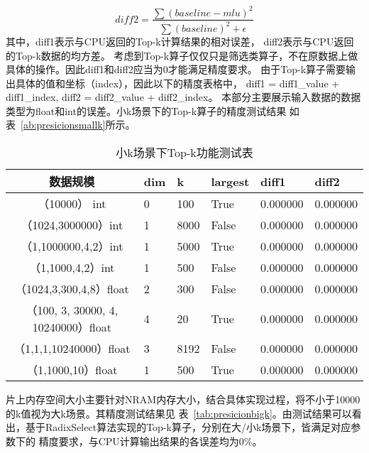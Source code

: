     \begin{equation}
    \label{eq:diff2}
    diff2 = \frac{\sum (baseline - mlu)^2}{\sum (baseline)^2 + \epsilon}
    \end{equation}
其中，diff1表示与CPU返回的Top-k计算结果的相对误差，
diff2表示与CPU返回的Top-k数据的均方差。
考虑到Top-k算子仅仅只是筛选类算子，不在原数据上做具体的操作。因此diff1和diff2应当为0才能满足精度要求。
由于Top-k算子需要输出具体的值和坐标（index），因此以下的精度表格中，
diff1 = diff1\_value + diff1\_index,
diff2 = diff2\_value + diff2\_index。
本部分主要展示输入数据的数据类型为float和int的误差。小k场景下的Top-k算子的精度测试结果
如表~\ref{ab:presicionsmallk}所示。
\begin{table}
\centering
\caption{小k场景下Top-k功能测试表}
\label{tab:presicionsmallk}
\begin{tabular}{clllll}
    \toprule
    数据规模      &dim   & k  & largest & diff1    & diff2 \\
    \midrule
    （10000） int &0  & 100      & True      & 0.000000 & 0.000000 \\
    （1024,3000000）int&1 & 8000 & False      & 0.000000 & 0.000000 \\
    （1,1000000,4,2）int &1  & 5000 & True      & 0.000000 & 0.000000 \\
    （1,1000,4,2）int &1  & 500 & False      & 0.000000 & 0.000000 \\
    
    （1024,3,300,4,8）float&2 & 300 & False      & 0.000000 & 0.000000 \\
    （100, 3, 30000, 4, 10240000）float&4 & 20 & True      & 0.000000 & 0.000000 \\
    （1,1,1,10240000）float & 3 & 8192 & False      & 0.000000 & 0.000000 \\
    （1,1000,10）float & 1  & 500 & True      & 0.000000 & 0.000000 \\
    
\bottomrule
\end{tabular}
\end{table}
片上内存空间大小主要针对NRAM内存大小，结合具体实现过程，将不小于10000的k值视为大k场景。其精度测试结果见
表~\ref{tab:presicionbigk}。由测试结果可以看出，基于RadixSelect算法实现的Top-k算子，分别在大/小k场景下，皆满足对应参数下的
精度要求，与CPU计算输出结果的各误差均为0\%。
